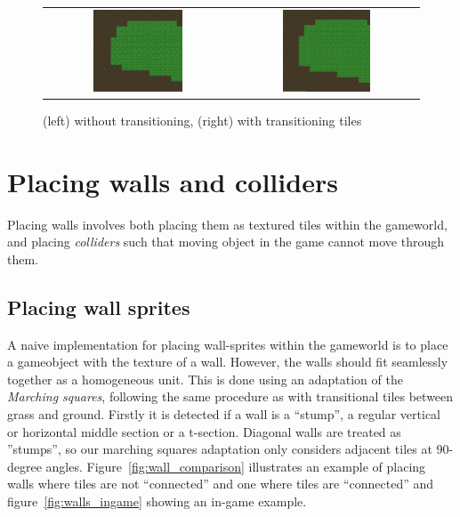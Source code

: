 \begin{figure}[H]
    \centering
    \begin{tabular}{cc}
        \includegraphics[width=0.5\textwidth]{figures/generating_levels/no_transition.png}
        &
        \includegraphics[width=0.5\textwidth]{figures/generating_levels/with_transition.png}
    \end{tabular}
    \caption{(left) without transitioning, (right) with transitioning tiles}\label{fig:transition_comparison}
\end{figure}

\section{Placing walls and colliders}
Placing walls involves both placing them as textured tiles within the gameworld, and placing \textit{colliders} such that moving object in the game cannot move through them.

\subsection{Placing wall sprites}
A naive implementation for placing wall-sprites within the gameworld is to place a gameobject with the texture of a wall.
However, the walls should fit seamlessly together as a homogeneous unit.
This is done using an adaptation of the \textit{Marching squares}, following the same procedure as with transitional tiles between grass and ground.
Firstly it is detected if a wall is a ``stump'', a regular vertical or horizontal middle section or a t-section. 
Diagonal walls are treated as ''stumps'', so our marching squares adaptation only considers adjacent tiles at 90-degree angles.
Figure~\ref{fig:wall_comparison} illustrates an example of placing walls where tiles are not ``connected'' and one where tiles are ``connected'' and figure~\ref{fig:walls_ingame} showing an in-game example.

